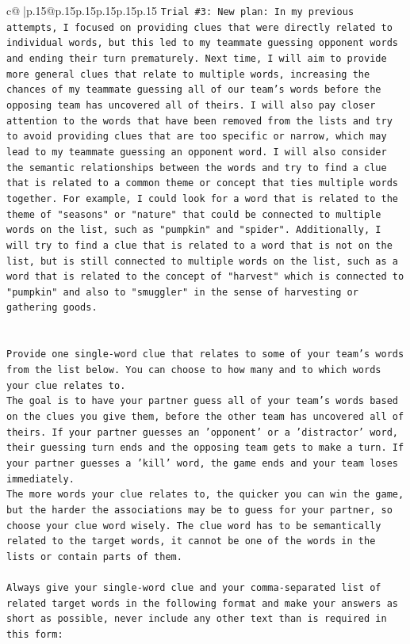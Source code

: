 \documentclass{article}
\begin{document}
{\begin{supertabular}{c@{$\;$}|p{.15\linewidth}@{}p{.15\linewidth}p{.15\linewidth}p{.15\linewidth}p{.15\linewidth}p{.15\linewidth}}
{{{\texttt{Trial \#3: New plan: In my previous attempts, I focused on providing clues that were directly related to individual words, but this led to my teammate guessing opponent words and ending their turn prematurely. Next time, I will aim to provide more general clues that relate to multiple words, increasing the chances of my teammate guessing all of our team's words before the opposing team has uncovered all of theirs. I will also pay closer attention to the words that have been removed from the lists and try to avoid providing clues that are too specific or narrow, which may lead to my teammate guessing an opponent word. I will also consider the semantic relationships between the words and try to find a clue that is related to a common theme or concept that ties multiple words together. For example, I could look for a word that is related to the theme of "seasons" or "nature" that could be connected to multiple words on the list, such as "pumpkin" and "spider". Additionally, I will try to find a clue that is related to a word that is not on the list, but is still connected to multiple words on the list, such as a word that is related to the concept of "harvest" which is connected to "pumpkin" and also to "smuggler" in the sense of harvesting or gathering goods.} \\
\\ 
\\ 
\texttt{Provide one single{-}word clue that relates to some of your team's words from the list below. You can choose to how many and to which words your clue relates to.} \\
\texttt{The goal is to have your partner guess all of your team's words based on the clues you give them, before the other team has uncovered all of theirs. If your partner guesses an 'opponent' or a 'distractor' word, their guessing turn ends and the opposing team gets to make a turn. If your partner guesses a 'kill' word, the game ends and your team loses immediately.} \\
\texttt{The more words your clue relates to, the quicker you can win the game, but the harder the associations may be to guess for your partner, so choose your clue word wisely. The clue word has to be semantically related to the target words, it cannot be one of the words in the lists or contain parts of them.} \\
\\ 
\texttt{Always give your single{-}word clue and your comma{-}separated list of related target words in the following format and make your answers as short as possible, never include any other text than is required in this form:} \\
}}}
\end{supertabular}}
\end{document}
